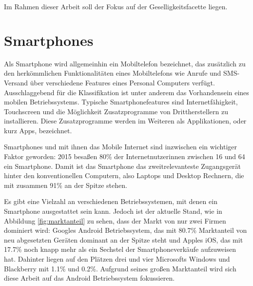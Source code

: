 Im Rahmen dieser Arbeit soll der Fokus auf der Geselligkeitsfacette liegen.

\section{Smartphones}

\label{ch:Grundlagen:sec:Abschnitt2}


Als Smartphone wird allgemeinhin ein Mobiltelefon bezeichnet, das zusätzlich zu den herkömmlichen Funktionalitäten eines Mobiltelefons wie Anrufe und SMS-Versand über verschiedene Features eines Personal Computers verfügt. 
Ausschlaggebend für die Klassifikation ist unter anderem das Vorhandensein eines mobilen Betriebssystems.
Typische Smartphonefeatures sind Internetfähigkeit, Touchscreen und die Möglichkeit Zusatzprogramme von Drittherstellern zu installieren.
Diese Zusatzprogramme werden im Weiteren als Applikationen, oder kurz Apps, bezeichnet.
\par

Smartphones und mit ihnen das Mobile Internet sind inzwischen ein wichtiger Faktor geworden:
2015 besaßen 80\% der Internetnutzerinnen zwischen 16 und 64 ein Smartphone. 
Damit ist das Smartphone das zweitrelevanteste Zugangsgerät hinter den konventionellen Computern, also Laptops und Desktop Rechnern, die mit zusammen 91\% an der Spitze stehen\cite{globalwebindex}.
\par

Es gibt eine Vielzahl an verschiedenen Betriebssystemen, mit denen ein Smartphone ausgestattet sein kann.
Jedoch ist der aktuelle Stand, wie in Abbildung \ref{fig:marktanteil} zu sehen, dass der Markt von nur zwei Firmen dominiert wird:
Googles Android Betriebssystem, das mit 80.7\% Marktanteil von neu abgesetzten Geräten dominant an der Spitze steht
und Apples iOS, das mit 17.7\% noch knapp mehr als ein Sechstel der Smartphoneverkäufe aufzuweisen hat.
Dahinter liegen auf den Plätzen drei und vier Microsofts Windows und Blackberry mit 1.1\% und 0.2\%\cite{smartphonemarktanteil}.
Aufgrund seines großen Marktanteil wird sich diese Arbeit auf das Android Betriebssystem fokussieren.

